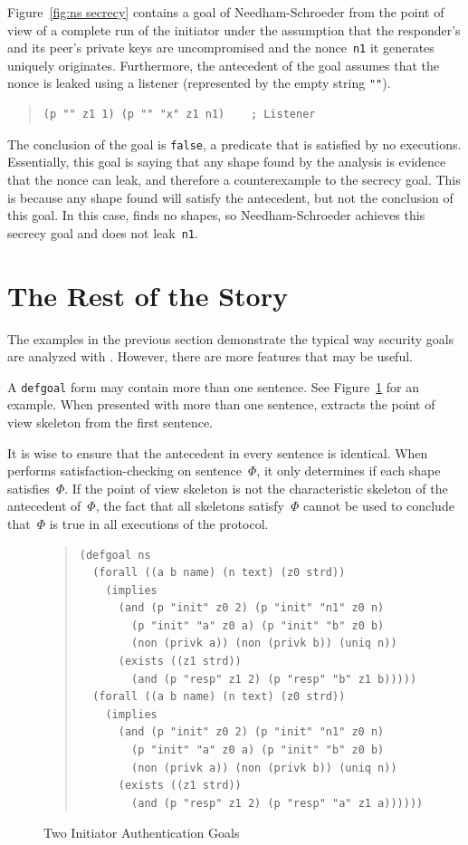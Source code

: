 Figure~\ref{fig:ns secrecy} contains a goal of Needham-Schroeder from
the point of view of a complete run of the initiator under the
assumption that the responder's and its peer's private keys are
uncompromised and the nonce~\texttt{n1} it generates uniquely
originates.  Furthermore, the antecedent of the goal assumes that the
nonce is leaked using a listener (represented by the empty string
\texttt{""}).
\begin{quote}
\begin{verbatim}
(p "" z1 1) (p "" "x" z1 n1)    ; Listener
\end{verbatim}
\end{quote}
The conclusion of the goal is \texttt{false}, a predicate that is
satisfied by no executions. Essentially, this goal is saying that any
shape found by the analysis is evidence that the nonce can leak, and
therefore a counterexample to the secrecy goal. This is because any
shape found will satisfy the antecedent, but not the conclusion of
this goal. In this case, {\cpsa} finds no shapes, so Needham-Schroeder
achieves this secrecy goal and does not leak~\texttt{n1}.

\section{The Rest of the Story}\label{sec:whole story}

The examples in the previous section demonstrate the typical way
security goals are analyzed with {\cpsa}.  However, there are more
features that may be useful.

A \texttt{defgoal} form may contain more than one sentence.  See
Figure~\ref{fig:ns init goals} for an example.  When presented with
more than one sentence, {\cpsa} extracts the point of view skeleton
from the first sentence.

It is wise to ensure that the antecedent in every sentence is
identical.  When {\cpsa} performs satisfaction-checking on
sentence~$\Phi$, it only determines if each shape 
satisfies~$\Phi$.  If the point of view skeleton is not the characteristic
skeleton of the antecedent of~$\Phi$, the fact that all skeletons
satisfy~$\Phi$ cannot be used to conclude that~$\Phi$ is true in all
executions of the protocol.

\begin{figure}
\begin{quote}\small
\begin{verbatim}
(defgoal ns
  (forall ((a b name) (n text) (z0 strd))
    (implies
      (and (p "init" z0 2) (p "init" "n1" z0 n)
        (p "init" "a" z0 a) (p "init" "b" z0 b)
        (non (privk a)) (non (privk b)) (uniq n))
      (exists ((z1 strd))
        (and (p "resp" z1 2) (p "resp" "b" z1 b)))))
  (forall ((a b name) (n text) (z0 strd))
    (implies
      (and (p "init" z0 2) (p "init" "n1" z0 n)
        (p "init" "a" z0 a) (p "init" "b" z0 b)
        (non (privk a)) (non (privk b)) (uniq n))
      (exists ((z1 strd))
        (and (p "resp" z1 2) (p "resp" "a" z1 a))))))
\end{verbatim}
\end{quote}
\caption{Two Initiator Authentication Goals}\label{fig:ns init goals}
\end{figure}

